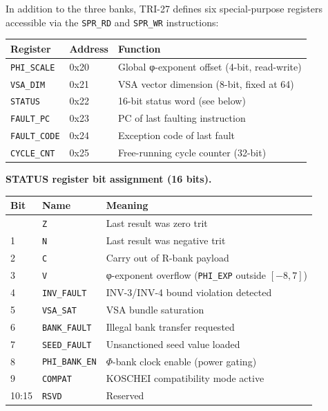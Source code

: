 In addition to the three banks, TRI-27 defines six
special-purpose registers accessible via the \texttt{SPR\_RD} and
\texttt{SPR\_WR} instructions:

\begin{longtable}[]{@{}llp{6cm}@{}}
\toprule\noalign{}
Register & Address & Function \\
\midrule\noalign{}
\endhead
\bottomrule\noalign{}
\endlastfoot
\texttt{PHI\_SCALE} & 0x20 & Global φ-exponent offset (4-bit, read-write) \\
\texttt{VSA\_DIM} & 0x21 & VSA vector dimension (8-bit, fixed at 64) \\
\texttt{STATUS} & 0x22 & 16-bit status word (see below) \\
\texttt{FAULT\_PC} & 0x23 & PC of last faulting instruction \\
\texttt{FAULT\_CODE} & 0x24 & Exception code of last fault \\
\texttt{CYCLE\_CNT} & 0x25 & Free-running cycle counter (32-bit) \\
\end{longtable}

\textbf{STATUS register bit assignment (16 bits).}

\begin{longtable}[]{@{}llp{7cm}@{}}
\toprule\noalign{}
Bit & Name & Meaning \\
\midrule\noalign{}
\endhead
\bottomrule\noalign{}
\endlastfoot
0 & \texttt{Z} & Last result was zero trit \\
1 & \texttt{N} & Last result was negative trit \\
2 & \texttt{C} & Carry out of R-bank payload \\
3 & \texttt{V} & φ-exponent overflow (\texttt{PHI\_EXP} outside $[-8,7]$) \\
4 & \texttt{INV\_FAULT} & INV-3/INV-4 bound violation detected \\
5 & \texttt{VSA\_SAT} & VSA bundle saturation \\
6 & \texttt{BANK\_FAULT} & Illegal bank transfer requested \\
7 & \texttt{SEED\_FAULT} & Unsanctioned seed value loaded \\
8 & \texttt{PHI\_BANK\_EN} & $\Phi$-bank clock enable (power gating) \\
9 & \texttt{COMPAT} & KOSCHEI compatibility mode active \\
10:15 & \texttt{RSVD} & Reserved \\
\end{longtable}

